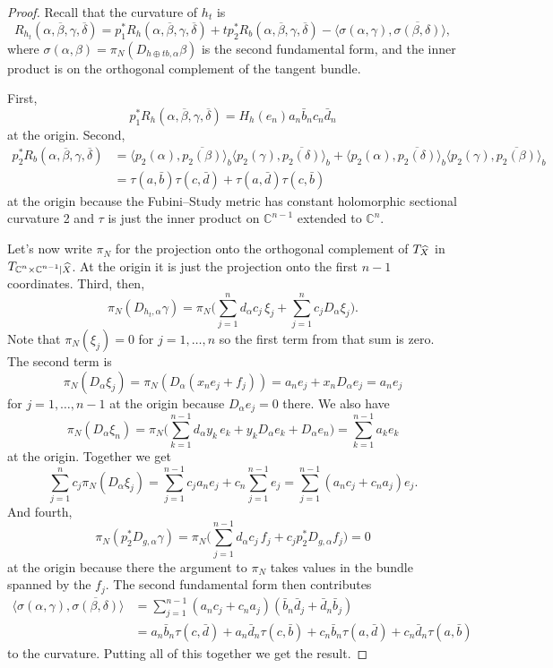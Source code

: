 \documentclass[10pt,a4paper]{amsart}
\newcommand{\kk}[1]{\mathbb{#1}}
\def\<{\langle}
\def\>{\rangle}
\def\fs{b}
\def\ton{a}
\def\ttw{b}
\def\tth{c}
\def\tfo{d}
\def\ov#1{\overline{#1}}
\def\hsc{holomorphic sectional curvature}
\def\bl#1{\widehat{#1}}
\def\blX{\bl{X}}
\begin{document}
\begin{proof}
Recall that the curvature of $h_t$ is
$$
R_{h_t}(\alpha, \ov\beta, \gamma, \ov\delta)
= p_1^* R_h(\alpha, \ov\beta, \gamma, \ov\delta)
+ t p_2^* R_b(\alpha, \ov\beta, \gamma, \ov\delta)
- \<\sigma(\alpha, \gamma), \ov{\sigma(\beta, \delta)}\>,
$$
where $\sigma(\alpha, \beta) = \pi_N(D_{h \oplus t \fs,\alpha} \beta)$ is
the second fundamental form, and the inner product is on the orthogonal complement
of the tangent bundle.

First,
$$
p_1^*R_h(\alpha, \ov\beta, \gamma, \ov\delta)
= H_h(e_n) \ton_n \bar \ttw_n \tth_n \bar \tfo_n
$$
at the origin. Second,
\begin{align*}
p_2^*R_b(\alpha, \ov\beta, \gamma, \ov\delta)
&= \< p_2(\alpha), \ov{p_2(\beta)} \>_b
\< p_2(\gamma), \ov{p_2(\delta)} \>_b
+ \< p_2(\alpha), \ov{p_2(\delta)} \>_b
\< p_2(\gamma), \ov{p_2(\beta)} \>_b
\\
&= \tau(\ton, \bar \ttw) \tau(\tth, \bar \tfo) + \tau(\ton, \bar \tfo) \tau(\tth, \bar \ttw)
\end{align*}
at the origin
because the Fubini--Study metric has constant \hsc{} 2
and $\tau$ is just the inner product on $\kk C^{n-1}$ extended to $\kk C^n$.

Let's now write $\pi_N$ for the projection onto the orthogonal complement of
$T_{\smash{\blX}}$ in $T_{\smash{\kk C^n \times \kk C^{n-1}|\blX}}$.
At the origin it is just the projection onto the first $n-1$ coordinates.
Third, then,
$$
\pi_N(D_{h_t,\alpha} \gamma)
= \pi_N\biggl(
\sum_{j=1}^{n} \tfo_{\alpha} \tth_j \, \xi_j
+ \sum_{j=1}^n \tth_j D_{\alpha} \xi_j
\biggr).
$$
Note that $\pi_N(\xi_j) = 0$ for $j=1,\ldots,n$ so the first term from that sum
is zero. The second term is
$$
\pi_N(D_{\alpha} \xi_j)
= \pi_N(D_{\alpha}(x_n e_j + f_j))
= \ton_n e_j + x_n D_{\alpha} e_j
= \ton_n e_j
$$
for $j=1,\ldots,n-1$ at the origin because $D_{\alpha} e_j = 0$ there.
We also have
$$
\pi_N(D_{\alpha} \xi_n)
= \pi_N\biggl(
\sum_{k=1}^{n-1} \tfo_{\alpha} y_k \, e_k + y_k D_{\alpha} e_k
+ D_{\alpha} e_n
\biggr)
= \sum_{k=1}^{n-1} \ton_k e_k
$$
at the origin.
Together we get
$$
\sum_{j=1}^n \tth_j \pi_N(D_{\alpha} \xi_j)
= \sum_{j=1}^{n-1} \tth_j \ton_n e_j + \tth_n \sum_{j=1}^{n-1} e_j
= \sum_{j=1}^{n-1} (\ton_n \tth_j + \tth_n \ton_j) e_j.
$$
And fourth,
$$
\pi_N(p_2^*D_{g,\alpha} \gamma)
= \pi_N \biggl(
\sum_{j=1}^{n-1} \tfo_\alpha \tth_j \, f_j
+ \tth_j p_2^*D_{g,\alpha} f_j \biggr) = 0
$$
at the origin because there the argument to $\pi_N$ takes values in the bundle
spanned by the $f_j$.
The second fundamental form then contributes
\begin{align*}
\<\sigma(\alpha, \gamma), \ov{\sigma(\beta, \delta)}\>
&=
\sum_{j=1}^{n-1} (\ton_n \tth_j + \tth_n \ton_j) (\bar \ttw_n \bar \tfo_j + \bar \tfo_n \bar \ttw_j)
\\
&= \ton_n \bar \ttw_n \tau(\tth, \bar \tfo)
+ \ton_n \bar \tfo_n \tau(\tth, \bar \ttw)
+ \tth_n \bar \ttw_n \tau(\ton, \bar \tfo)
+ \tth_n \bar \tfo_n \tau(\ton, \bar \ttw)
\end{align*}
to the curvature. Putting all of this together we get the result.
\end{proof}
\end{document}
